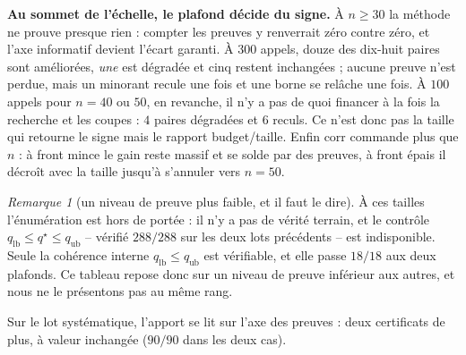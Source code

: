\documentclass[11pt,a4paper]{article}
\theoremstyle{plain}
\theoremstyle{remark}
\newtheorem{remark}{Remarque}
\newcommand{\qs}{q^{\star}}
\begin{document}
\noindent
\textbf{Au sommet de l'échelle, le plafond décide du signe.} À $n\ge 30$ la
méthode ne prouve presque rien : compter les preuves y renverrait zéro
contre zéro, et l'axe informatif devient l'écart garanti. À $300$ appels,
douze des dix-huit paires sont améliorées, \emph{une} est dégradée et cinq
restent inchangées ; aucune preuve n'est perdue, mais un minorant recule une
fois et une borne se relâche une fois. À $100$ appels pour $n=40$ ou $50$,
en revanche, il n'y a pas de quoi financer à la fois la recherche et les
coupes : $4$ paires dégradées et $6$ reculs. Ce n'est donc pas la taille qui retourne le signe
mais le rapport budget/taille. Enfin $\text{corr}$ commande plus que $n$ :
à front mince le gain reste massif et se solde par des preuves, à front
épais il décroît avec la taille jusqu'à s'annuler vers $n=50$.

\begin{remark}[un niveau de preuve plus faible, et il faut le dire]
\label{rem:pasdevt}
À ces tailles l'énumération est hors de portée : il n'y a pas de vérité
terrain, et le contrôle $q_{\text{lb}}\le\qs\le q_{\text{ub}}$ -- vérifié
$288/288$ sur les deux lots précédents -- est indisponible. Seule la
cohérence interne $q_{\text{lb}}\le q_{\text{ub}}$ est vérifiable, et elle
passe $18/18$ aux deux plafonds. Ce tableau repose donc sur un niveau de
preuve inférieur aux autres, et nous ne le présentons pas au même rang.
\end{remark}

\noindent
Sur le lot systématique, l'apport se lit sur l'axe des preuves : deux
certificats de plus, à valeur inchangée ($90/90$ dans les deux cas).
\end{document}
